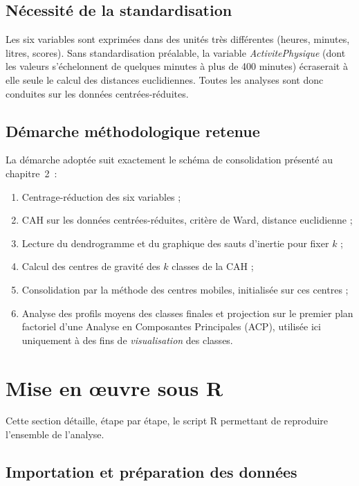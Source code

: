 \documentclass[11pt,a4paper,oneside]{book}
\begin{document}
\section{Nécessité de la standardisation}
Les six variables sont exprimées dans des unités très différentes (heures, minutes, litres, scores). Sans standardisation préalable, la variable \emph{ActivitePhysique} (dont les valeurs s'échelonnent de quelques minutes à plus de 400 minutes) écraserait à elle seule le calcul des distances euclidiennes. Toutes les analyses sont donc conduites sur les données centrées-réduites.

\section{Démarche méthodologique retenue}
La démarche adoptée suit exactement le schéma de consolidation présenté au chapitre~2~:
\begin{enumerate}
  \item Centrage-réduction des six variables ;
  \item CAH sur les données centrées-réduites, critère de Ward, distance euclidienne ;
  \item Lecture du dendrogramme et du graphique des sauts d'inertie pour fixer $k$ ;
  \item Calcul des centres de gravité des $k$ classes de la CAH ;
  \item Consolidation par la méthode des centres mobiles, initialisée sur ces centres ;
  \item Analyse des profils moyens des classes finales et projection sur le premier plan factoriel d'une Analyse en Composantes Principales (ACP), utilisée ici uniquement à des fins de \emph{visualisation} des classes.
\end{enumerate}

\chapter{Mise en \oe uvre sous R}

Cette section détaille, étape par étape, le script R permettant de reproduire l'ensemble de l'analyse.

\section{Importation et préparation des données}
\end{document}
